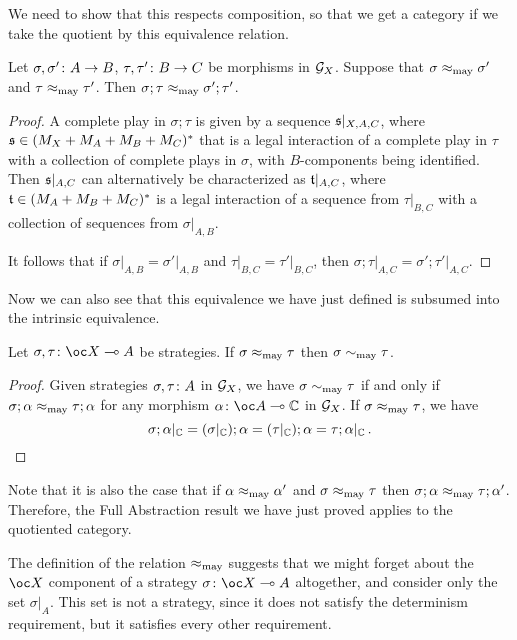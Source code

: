 \documentclass[11pt]{report}
\begin{document}
We need to show that this respects composition, so that we get a category if we take the quotient by this equivalence relation.
\begin{proposition}
  Let $\sigma,\sigma' \colon A \to B$, $\tau,\tau'\colon B \to C$ be morphisms in $\mathcal G_X$.
  Suppose that $\sigma\approx_{\operatorname{may}}\sigma'$ and $\tau\approx_{\operatorname{may}}\tau'$.  
  Then $\sigma;\tau \approx_{\operatorname{may}} \sigma';\tau'$.
\end{proposition}
\begin{proof}
  A complete play in $\sigma;\tau$ is given by a sequence $\mathfrak s\vert_{X,A,C}$, where $\mathfrak s\in (M_X + M_A + M_B + M_C)^*$ that is a legal interaction of a complete play in $\tau$ with a collection of complete plays in $\sigma$, with $B$-components being identified.
  Then $\mathfrak s\vert_{A,C}$ can alternatively be characterized as $\mathfrak t\vert_{A,C}$, where $\mathfrak t\in (M_A + M_B + M_C)^*$ is a legal interaction of a sequence from $\tau\vert_{B,C}$ with a collection of sequences from $\sigma\vert_{A,B}$.  

  It follows that if $\sigma\vert_{A,B}=\sigma'\vert_{A,B}$ and $\tau\vert_{B,C}=\tau'\vert_{B,C}$, then $\sigma;\tau\vert_{A,C} = \sigma';\tau'\vert_{A,C}$.
\end{proof}

Now we can also see that this equivalence we have just defined is subsumed into the intrinsic equivalence.
\begin{proposition}
  Let $\sigma,\tau\from \oc X \implies A$ be strategies.  
  If $\sigma\approx_{\operatorname{may}}\tau$ then $\sigma\sim_{\operatorname{may}} \tau$.
\end{proposition}
\begin{proof}
  Given strategies $\sigma,\tau\colon A$ in $\mathcal G_X$, we have $\sigma \sim_{\operatorname{may}} \tau$ if and only if $\sigma;\alpha\approx_{\operatorname{may}}\tau;\alpha$ for any morphism $\alpha\from \oc A \implies \bC$ in $\mathcal G_X$.
  If $\sigma\approx_{\operatorname{may}}\tau$, we have
  \[
    \sigma;\alpha\vert_{\mathbb{C}} = (\sigma\vert_{\mathbb{C}});\alpha = (\tau\vert_{\mathbb{C}});\alpha = \tau;\alpha\vert_{\mathbb{C}}\,.\qedhere
    \]
\end{proof}

Note that it is also the case that if $\alpha\approx_{\operatorname{may}}\alpha'$ and $\sigma\approx_{\operatorname{may}}\tau$ then $\sigma;\alpha \approx_{\operatorname{may}} \tau;\alpha'$.  
Therefore, the Full Abstraction result we have just proved applies to the quotiented category.

The definition of the relation $\approx_{\operatorname{may}}$ suggests that we might forget about the $\oc X$ component of a strategy $\sigma\from\oc X \implies A$ altogether, and consider only the set $\sigma\vert_A$.  
This set is not a strategy, since it does not satisfy the determinism requirement, but it satisfies every other requirement.
\end{document}
